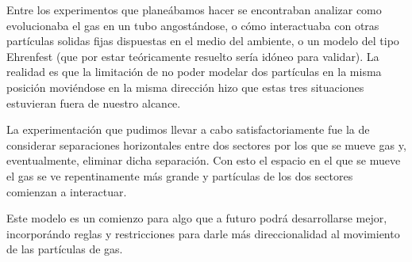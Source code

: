 \documentclass[10pt,a4paper]{article}
\begin{document}
Entre los experimentos que plane\'abamos hacer se encontraban analizar como evolucionaba el gas en un tubo angost\'andose, o c\'omo interactuaba con otras part\'iculas solidas fijas dispuestas en el medio del ambiente, o un modelo del tipo Ehrenfest (que por estar te\'oricamente resuelto ser\'ia id\'oneo para validar). La realidad es que la limitaci\'on de no poder modelar dos part\'iculas en la misma posici\'on movi\'endose en la misma direcci\'on hizo que estas tres situaciones estuvieran fuera de nuestro alcance.

La experimentaci\'on que pudimos llevar a cabo satisfactoriamente fue la de considerar separaciones horizontales entre dos sectores por los que se mueve gas y, eventualmente, eliminar dicha separaci\'on. Con esto el espacio en el que se mueve el gas se ve repentinamente m\'as grande y part\'iculas de los dos sectores comienzan a interactuar.

Este modelo es un comienzo para algo que a futuro podr\'a desarrollarse mejor, incorpor\'ando reglas y restricciones para darle m\'as direccionalidad al movimiento de las part\'iculas de gas.
\end{document}
